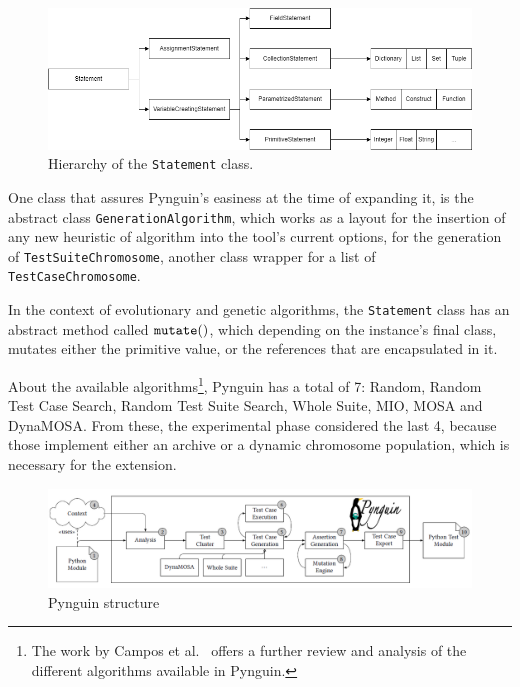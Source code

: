 \documentclass[%
  chapterprefix=false,%
  open=right,%
  twoside=true,%
  paper=a4,%
  logofile={Figures/logo.png},%
  thesistype=master,%
  UKenglish,%
]{se2thesis}
\newcommand{\classname}[1]{\texttt{#1}}
\newcommand{\callable}[2][]{\(\text{\texttt{#2}}(#1)\)}
\begin{document}
\begin{figure}[htb]\label{fig:hierarchy}
  \centering
  \includegraphics[width=1\textwidth]{Figures/statement_hierarchy2.png}
  \vspace*{0.5cm}
  \caption{Hierarchy of the \classname{Statement} class.}
\end{figure}

One class that assures Pynguin's easiness at the time of expanding it, is the abstract class \classname{GenerationAlgorithm}, which works as a layout for the insertion of any new heuristic of algorithm into the tool's current options, for the generation of \classname{TestSuiteChromosome}, another class wrapper for a list of \classname{TestCaseChromosome}.

In the context of evolutionary and genetic algorithms, the \classname{Statement} class has an abstract method called \callable{mutate}, which depending on the instance's final class, mutates either the primitive value, or the references that are encapsulated in it.

About the available algorithms\footnote{The work by Campos et al.~\cite{DBLP:journals/infsof/CamposGAFEA18} offers a further review and analysis of the different algorithms available in Pynguin.}, Pynguin has a total of 7: Random, Random Test Case Search, Random Test Suite Search, Whole Suite, MIO, MOSA and DynaMOSA.\@
From these, the experimental phase considered the last 4, because those implement either an archive or a dynamic chromosome population, which is necessary for the extension.

\begin{figure}[tb]
  \centering
  \includegraphics[width=.99\textwidth]{Figures/pynguin.png}
  \caption{Pynguin structure~\cite{DBLP:conf/icse/LukasczykF22}}\label{fig:pyn}
\end{figure}
\end{document}
